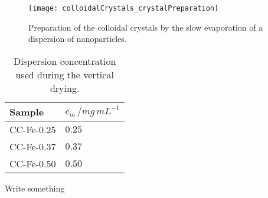 \documentclass[\main/dresen_thesis.tex]{subfiles}
\begin{document}
  \begin{figure}[tb]
    \centering
    \texttt{[image: colloidalCrystals\_crystalPreparation]}
    \caption{\label{fig:colloidalCrystals:preparation:image}Preparation of the colloidal crystals by the slow evaporation of a dispersion of nanoparticles.}
  \end{figure}

  \begin{table}[!htbp]
    \centering
    \caption{\label{tab:colloidalCrystals:preparation:conditions} Dispersion concentration used during the vertical drying.}
    \begin{tabular}{ l | l }
      \textbf{Sample}  & $c_m \, /  \unit{mg \, mL^{-1}}$\\
      \hline
      CC-Fe-0.25    & $0.25$\\
      CC-Fe-0.37    & $0.37$\\
      CC-Fe-0.50    & $0.50$\\
      \hline
    \end{tabular}
  \end{table}

  Write something


\end{document}
